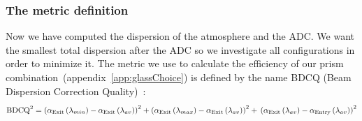 %
%
%
%
%
%
%
%




\subsubsection{The metric definition}
Now we have computed the dispersion of the atmosphere and the ADC. We want the smallest total dispersion after the ADC so we investigate all configurations in order to minimize it. The metric we use to calculate the efficiency of our prism combination~(appendix~\ref{app:glassChoice}) is defined by the name BDCQ (Beam Dispersion Correction Quality)~:
\begin{equation}
	\text{BDCQ}^2 = \left(\alpha_\text{Exit}\left(\lambda_{min}\right)-\alpha_\text{Exit}\left(\lambda_{av}\right)\right)^2 + \left(\alpha_\text{Exit}\left(\lambda_{max}\right)-\alpha_\text{Exit}\left(\lambda_{av}\right)\right)^2 +\\
	 \left(\alpha_\text{Exit}\left(\lambda_{av}\right)-\alpha_\text{Entry}\left(\lambda_{av}\right)\right)^2
\end{equation}


